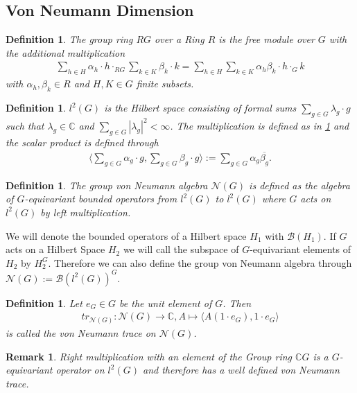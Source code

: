 \documentclass[12pt,a4paper]{scrartcl}
\newtheorem{Definition}[Theorem]{Definition}
\newtheorem{Remark}[Theorem]{Remark}
\numberwithin{equation}{section}
\newcommand{\C}{\mathbb{C}} %
\newcommand{\2}{\mathbb{Z} / 2 \mathbb{Z}}
\newcommand{\1}{\overline{1}}
\newcommand{\0}{\overline{0}}
\begin{document}
\subsection{Von Neumann Dimension}

\begin{Definition} \label{GR}
	The group ring $RG$ over a Ring $R$ is the free module over $G$ with the additional multiplication
	\begin{align*}
		\sum_{h \in H} \alpha_h \cdot h \cdot_{RG} \sum_{k \in K} \beta_k \cdot k = \sum_{h \in H} \sum_{k \in K} \alpha_h \beta_k \cdot h \cdot_G k
	\end{align*}
	with $\alpha_h, \beta_k \in R$ and $H, K \in G$ finite subsets.
\end{Definition}
\begin{Definition}
	$l^2(G)$ is the Hilbert space consisting of formal sums $\sum_{g \in G} \lambda_g \cdot g$ such that $\lambda_g \in \C$ and $\sum_{g \in G} |\lambda_g|^2 < \infty$. The multiplication is defined as in \ref{GR} and the scalar product is defined through
	\begin{align*}
		\langle \sum_{g \in G} \alpha_g \cdot g, \sum_{g \in G} \beta_g \cdot g \rangle := \sum_{g \in G} \alpha_g \overline{\beta_g}.
	\end{align*}
\end{Definition}
\begin{Definition}
	The group von Neumann algebra $\mathcal{N}(G)$ is defined as the algebra of $G$-equivariant bounded operators from $l^2(G)$ to $l^2(G)$ where $G$ acts on $l^2(G)$ by left multiplication.
\end{Definition}
We will denote the bounded operators of a Hilbert space $H_1$ with $\mathcal{B}(H_1)$. If $G$ acts on a Hilbert Space $H_2$ we will call the subspace of $G$-equivariant elements of $H_2$ by $H_2^G$. Therefore we can also define the group von Neumann algebra through $\mathcal{N}(G) := \mathcal{B}(l^2(G))^G$.
\begin{Definition}
	Let $e_G \in G$ be the unit element of $G$. Then
	\begin{align*}
		tr_{\mathcal{N}(G)}: \mathcal{N}(G) \to \C, A  \mapsto \langle A(1 \cdot e_G), 1 \cdot e_G \rangle
	\end{align*}
	is called the von Neumann trace on $\mathcal{N}(G)$.
\end{Definition}
\begin{Remark}
	Right multiplication with an element of the Group ring $\C G$ is a $G$-equivariant operator on $l^2(G)$ and therefore has a well defined von Neumann trace.
\end{Remark}
\end{document}
